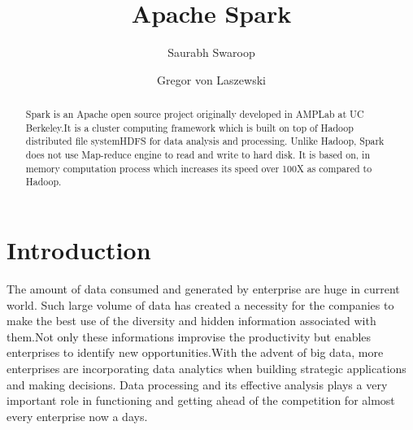 
\title{Apache Spark}


\author{Saurabh Swaroop}

\author{Gregor von Laszewski}


\renewcommand{\shortauthors}{G. v. Laszewski}


\begin{abstract}

Spark is an Apache open source project originally developed in AMPLab at UC
Berkeley.It is a cluster computing framework which is built on top of Hadoop
distributed file systemHDFS for data analysis and processing. Unlike Hadoop,
Spark does not use Map-reduce engine to read and write to hard disk.
It is based on, in memory computation process which increases its speed over
100X as compared to Hadoop.

\end{abstract}



\maketitle


\section{Introduction}

The amount of data consumed and generated by enterprise are huge in current world.
Such large volume of data has created a necessity for the companies to make the
best use of the diversity and hidden information associated with them.Not only these
informations improvise the productivity but enables enterprises to identify new
opportunities.With the advent of big data, more enterprises are incorporating data
analytics when building strategic applications and making decisions. Data processing
and its effective analysis plays a very important role in functioning and getting
ahead of the competition for almost every enterprise now a days.



